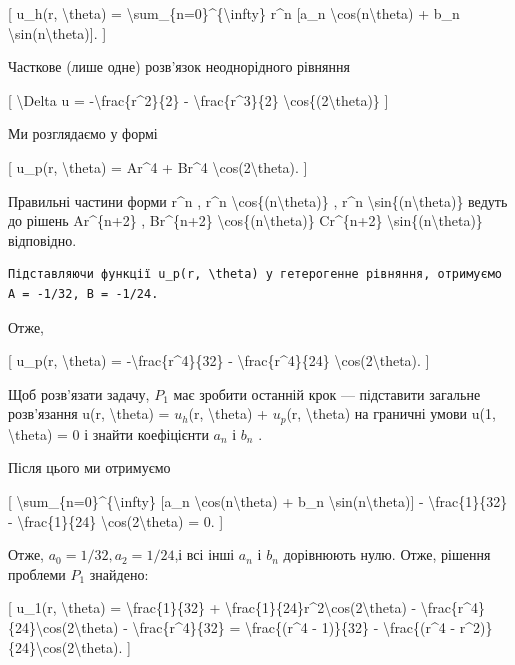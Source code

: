 \documentclass[
]{article}
\begin{document}
{[} u\_h(r, \textbackslash theta) =
\textbackslash sum\_\{n=0\}\^{}\{\textbackslash infty\} r\^{}n {[}a\_n
\textbackslash cos(n\textbackslash theta) + b\_n
\textbackslash sin(n\textbackslash theta){]}. {]}

Часткове (лише одне) розв'язок неоднорідного рівняння

{[} \textbackslash Delta u = -\textbackslash frac\{r\^{}2\}\{2\} -
\textbackslash frac\{r\^{}3\}\{2\}
\textbackslash cos\{(2\textbackslash theta)\} {]}

Ми розглядаємо у формі

{[} u\_p(r, \textbackslash theta) = Ar\^{}4 + Br\^{}4
\textbackslash cos(2\textbackslash theta). {]}

Правильні частини форми r\^{}n , r\^{}n
\textbackslash cos\{(n\textbackslash theta)\} , r\^{}n
\textbackslash sin\{(n\textbackslash theta)\} ведуть до рішень
Ar\^{}\{n+2\} , Br\^{}\{n+2\}
\textbackslash cos\{(n\textbackslash theta)\} Cr\^{}\{n+2\}
\textbackslash sin\{(n\textbackslash theta)\} відповідно.

\begin{verbatim}
Підставляючи функції u_p(r, \theta) у гетерогенне рівняння, отримуємо A = -1/32, B = -1/24.
\end{verbatim}

Отже,

{[} u\_p(r, \textbackslash theta) = -\textbackslash frac\{r\^{}4\}\{32\}
- \textbackslash frac\{r\^{}4\}\{24\}
\textbackslash cos(2\textbackslash theta). {]}

Щоб розв'язати задачу, \(P_1\) має зробити останній крок --- підставити
загальне розв'язання u(r, \textbackslash theta) = \(u_h\)(r,
\textbackslash theta) + \(u_p\)(r, \textbackslash theta) на граничні
умови u(1, \textbackslash theta) = 0 і знайти коефіцієнти \(a_n\) і
\(b_n\) .

Після цього ми отримуємо

{[} \textbackslash sum\_\{n=0\}\^{}\{\textbackslash infty\} {[}a\_n
\textbackslash cos(n\textbackslash theta) + b\_n
\textbackslash sin(n\textbackslash theta){]} -
\textbackslash frac\{1\}\{32\} - \textbackslash frac\{1\}\{24\}
\textbackslash cos(2\textbackslash theta) = 0. {]}

Отже, \(a_0=1/32 , a_2=1/24\),і всі інші \(a_n\) і \(b_n\) дорівнюють
нулю. Отже, рішення проблеми \(P_1\) знайдено:

{[} u\_1(r, \textbackslash theta) = \textbackslash frac\{1\}\{32\} +
\textbackslash frac\{1\}\{24\}r\^{}2\textbackslash cos(2\textbackslash theta)
-
\textbackslash frac\{r\^{}4\}\{24\}\textbackslash cos(2\textbackslash theta)
- \textbackslash frac\{r\^{}4\}\{32\} = \textbackslash frac\{(r\^{}4 -
1)\}\{32\} - \textbackslash frac\{(r\^{}4 -
r\^{}2)\}\{24\}\textbackslash cos(2\textbackslash theta). {]}
\end{document}
